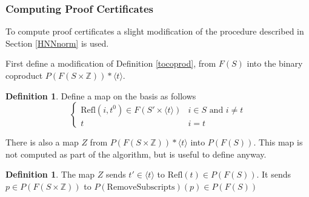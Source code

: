 \documentclass[12pt]{article} %
\theoremstyle{definition}
\theoremstyle{definition}
\theoremstyle{definition}
\theoremstyle{definition}
\theoremstyle{definition}
\newtheorem{defn}[theorem]{Definition}
\theoremstyle{definition}
\begin{document}

\subsubsection{Computing Proof Certificates}\label{HNNPC}

To compute proof certificates a slight modification of the procedure described in Section
\ref{HNNnorm} is used.

First define a modification of Definition \ref{tocoprod}, from $F(S)$ into the binary
coproduct $P(F(S \times \mathbb{Z})) \ast \langle t \rangle$.

\begin{defn}\label{tocoprodP}
  Define a map on the basis as follows
  \begin{equation}
    \begin{cases}
      \text{Refl}(i, t^0) \in F(S' \times \langle t \rangle) & i \in S \text{ and } i \ne t \\
      t & i = t
    \end{cases}
  \end{equation}
\end{defn}

There is also a map $Z$ from $P(F(S \times \mathbb{Z})) \ast \langle t \rangle$ into
$P(F(S))$. This map is not computed as part of the algorithm, but is useful to define anyway.

\begin{defn}
  The map $Z$ sends $t' \in \langle t \rangle$ to $\text{Refl}(t) \in P(F(S))$.
  It sends $p \in P(F(S \times \mathbb{Z}))$ to $P(\text{RemoveSubscripts})(p) \in P(F(S))$
\end{defn}
\end{document}
